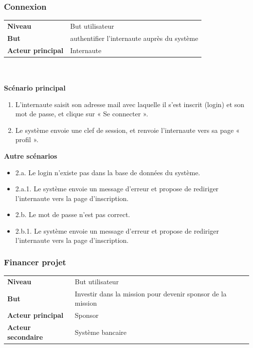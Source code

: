 \documentclass[11pt,a4paper]{article}
\begin{document}
\subsubsection{Connexion}

\begin{tabular}{ll}
    \textbf{Niveau} & But utilisateur \\
    \textbf{But} & authentifier l’internaute auprès du système \\
    \textbf{Acteur principal} & Internaute \newline
\end{tabular}
~\\
~\\

\textbf{Scénario principal}

\begin{enumerate}
    \item L’internaute saisit son adresse mail avec laquelle il s’est inscrit (login) et son mot de passe, et clique sur « Se connecter ».
    \item Le système envoie une clef de session, et renvoie l’internaute vers sa page « profil ».
\end{enumerate}

\textbf{Autre scénarios}

\begin{itemize}[label=]
    \item 2.a.  Le login n’existe pas dans la base de données du système.
    \item 2.a.1.    Le système envoie un message d’erreur et propose de rediriger l’internaute      vers la page d’inscription.
    \item 2.b.  Le mot de passe n’est pas correct.
    \item 2.b.1.    Le système envoie un message d’erreur et propose de rediriger l’internaute      vers la page d’inscription.
\end{itemize}



\subsubsection{Financer projet}

\begin{tabular}{ll}
    \textbf{Niveau} & But utilisateur \\
    \textbf{But} & Investir dans la mission pour devenir sponsor de la mission \\
    \textbf{Acteur principal} & Sponsor \\
    \textbf{Acteur secondaire} & Système bancaire \newline
\end{tabular}
~\\
~\\
\end{document}
